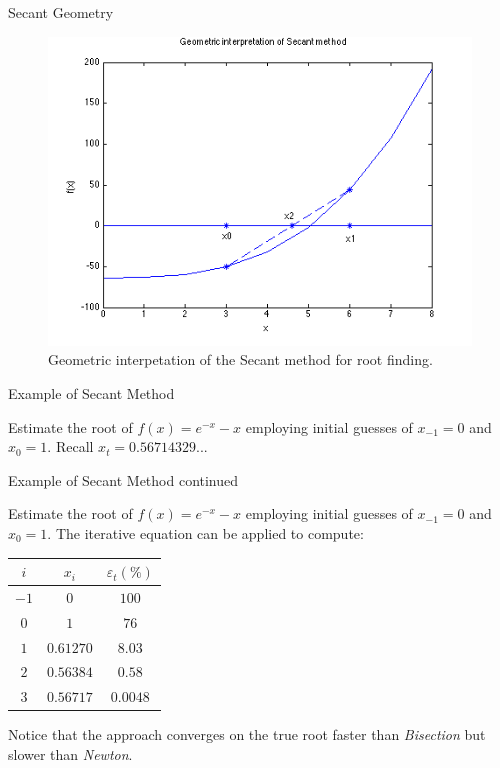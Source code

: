 \documentclass[12pt]{beamer}
\begin{document}
\begin{frame}{Secant Geometry} 
\begin{figure} 
  \centering
  \includegraphics[scale=0.5]{secant}
  \caption{Geometric interpetation of the Secant method for
    root finding.}
  \label{fig:newton}
\end{figure}
\end{frame} 

\begin{frame}{Example of Secant Method} 

Estimate the root of $f(x) = e^{-x} -x$ employing initial guesses of
$x_{-1} = 0$ and $x_0 = 1$. Recall $x_t=0.56714329...$
\vspace{3 in}
\end{frame} 

\begin{frame}{Example of Secant Method continued} 

Estimate the root of $f(x) = e^{-x} -x$ employing initial guesses of
$x_{-1} = 0$ and $x_0 = 1$. The iterative equation can be applied to compute: 

\begin{table}[h]
\begin{tabular}{c|c|c} 
$i$ & $x_i$ & $\varepsilon_t(\%)$ \\ 
\hline 
$-1$ & $0$ & $100$ \\
$0$ & $1$ & $76$ \\ 
$1$ & $0.61270$ & $8.03$ \\
$2$ & $0.56384$ & $0.58$ \\ 
$3$ & $0.56717$ & $0.0048$ \\  
\hline
\end{tabular} 
\end{table} 
\noindent 
Notice that the approach converges on the true root faster than 
{\it Bisection} but slower than {\it Newton}. 
\end{frame} 
\end{document}
